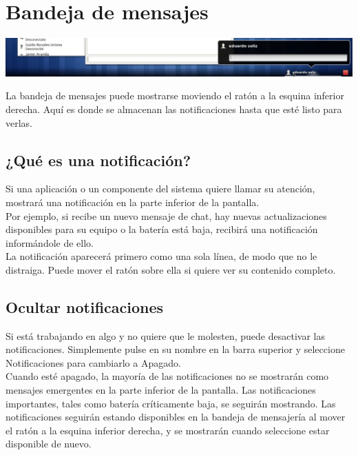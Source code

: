 \section{Bandeja de mensajes}
\begin{center}
\includegraphics[scale=0.5]{img/bandeja.png} 
\end{center}
La bandeja de mensajes puede mostrarse moviendo el ratón a la esquina inferior derecha. Aquí es donde se almacenan las notificaciones hasta que esté listo para verlas.
\subsection{¿Qué es una notificación?}
Si una aplicación o un componente del sistema quiere llamar su atención, mostrará una notificación en la parte inferior de la pantalla.\\
Por ejemplo, si recibe un nuevo mensaje de chat, hay nuevas actualizaciones disponibles para su equipo o la batería está baja, recibirá una notificación informándole de ello.\\

La notificación aparecerá primero como una sola línea, de modo que no le distraiga. Puede mover el ratón sobre ella si quiere ver su contenido completo.

\subsection{Ocultar notificaciones}
Si está trabajando en algo y no quiere que le molesten, puede desactivar las notificaciones. Simplemente pulse en su nombre en la barra superior y seleccione Notificaciones para cambiarlo a Apagado.\\
Cuando esté apagado, la mayoría de las notificaciones no se mostrarán como mensajes emergentes en la parte inferior de la pantalla. Las notificaciones importantes, tales como batería críticamente baja, se seguirán mostrando. Las notificaciones seguirán estando disponibles en la bandeja de mensajería al mover el ratón a la esquina inferior derecha, y se mostrarán cuando seleccione estar disponible de nuevo.